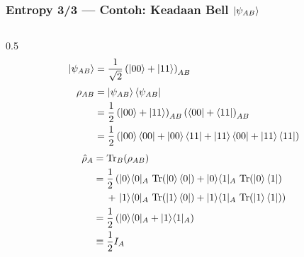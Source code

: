 \begin{frame}
    \frametitle{Entropy 3/3 --- Contoh: Keadaan Bell $ \ket{\psi_{AB}} $}
    \vspace*{-0.5cm}
    \begin{columns}[T]
        \tiny
        \begin{column}{0.5\textwidth}
            \begin{align*}
                \ket{\psi_{AB}} &= \frac{1}{\sqrt{2}}\left(\ket{00}+\ket{11}\right)_{AB}\\[2pt]
                \rho_{AB} &= \ket{\psi_{AB}}\bra{\psi_{AB}}\\
                &= \frac{1}{2}\left(\ket{00}+\ket{11}\right)_{AB}
                   \left(\bra{00}+\bra{11}\right)_{AB}\\
                &= \frac{1}{2}\left(\ket{00}\bra{00}+\ket{00}\bra{11}
                   +\ket{11}\bra{00}+\ket{11}\bra{11}\right)
            \end{align*}
            \begin{align*}
                \hat{\rho}_A &= \operatorname{Tr}_B(\rho_{AB})\\
                &= \frac{1}{2}\left(
                   |0\rangle\langle 0|_A\,\operatorname{Tr}\!\left(\ket{0}\bra{0}\right)
                 + |0\rangle\langle 1|_A\,\operatorname{Tr}\!\left(\ket{0}\bra{1}\right)\right.\\
                &\quad\; +\left.
                   |1\rangle\langle 0|_A\,\operatorname{Tr}\!\left(\ket{1}\bra{0}\right)
                 + |1\rangle\langle 1|_A\,\operatorname{Tr}\!\left(\ket{1}\bra{1}\right)\right)\\
                &= \frac{1}{2}\left(|0\rangle\langle 0|_A
                   +|1\rangle\langle 1|_A\right)\\
                &\equiv \frac{1}{2}I_A
            \end{align*}
        \end{column}


\end{columns}
\end{frame}
